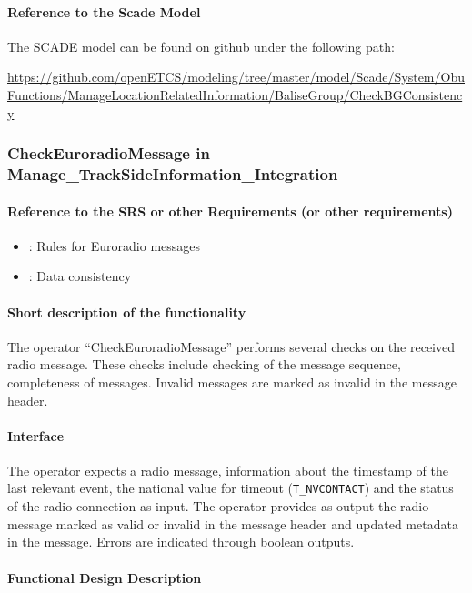 \paragraph{Reference to the Scade Model}
The SCADE model can be found on github under the following path:

\tiny\url{https://github.com/openETCS/modeling/tree/master/model/Scade/System/ObuFunctions/ManageLocationRelatedInformation/BaliseGroup/CheckBGConsistency}
\normalsize

\subsubsection{CheckEuroradioMessage in Manage\_TrackSideInformation\_Integration}%
\paragraph{Reference to the SRS or other Requirements (or other requirements)}
\begin{itemize}
 \item \cite[Chapt.~8.4.4]{subset-026}: Rules for Euroradio messages
 \item \cite[Chapt.~3.16]{subset-026}: Data consistency
\end{itemize}
\paragraph{Short description of the functionality}

The operator ``CheckEuroradioMessage'' performs several checks on the received radio message. These checks include checking of the message sequence, completeness of messages. Invalid messages are marked as invalid in the message header.

\paragraph{Interface}
The operator expects a radio message, information about the timestamp of the last relevant event, the national value for timeout (\texttt{T\_NVCONTACT}) and the status of the radio connection as input. The operator provides as output the radio message marked as valid or invalid in the message header and updated metadata in the message. Errors are indicated through boolean outputs.

\paragraph{Functional Design Description}

